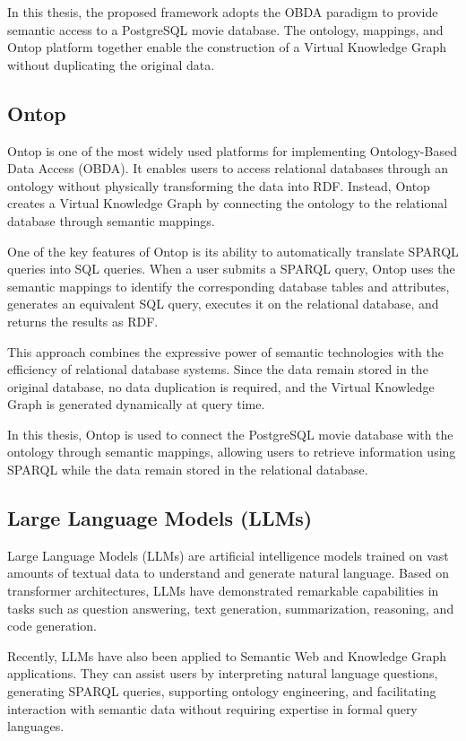 In this thesis, the proposed framework adopts the OBDA paradigm to provide semantic access to a PostgreSQL movie database. The ontology, mappings, and Ontop platform together enable the construction of a Virtual Knowledge Graph without duplicating the original data.
\subsection{Ontop}
Ontop is one of the most widely used platforms for implementing Ontology-Based Data Access (OBDA). It enables users to access relational databases through an ontology without physically transforming the data into RDF. Instead, Ontop creates a Virtual Knowledge Graph by connecting the ontology to the relational database through semantic mappings.

One of the key features of Ontop is its ability to automatically translate SPARQL queries into SQL queries. When a user submits a SPARQL query, Ontop uses the semantic mappings to identify the corresponding database tables and attributes, generates an equivalent SQL query, executes it on the relational database, and returns the results as RDF.

This approach combines the expressive power of semantic technologies with the efficiency of relational database systems. Since the data remain stored in the original database, no data duplication is required, and the Virtual Knowledge Graph is generated dynamically at query time.

In this thesis, Ontop is used to connect the PostgreSQL movie database with the ontology through semantic mappings, allowing users to retrieve information using SPARQL while the data remain stored in the relational database.
\subsection{Large Language Models (LLMs)}
Large Language Models (LLMs) are artificial intelligence models trained on vast amounts of textual data to understand and generate natural language. Based on transformer architectures, LLMs have demonstrated remarkable capabilities in tasks such as question answering, text generation, summarization, reasoning, and code generation.

Recently, LLMs have also been applied to Semantic Web and Knowledge Graph applications. They can assist users by interpreting natural language questions, generating SPARQL queries, supporting ontology engineering, and facilitating interaction with semantic data without requiring expertise in formal query languages.

